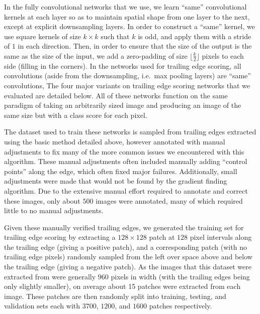 In the fully convolutional networks that we use, we learn ``same'' convolutional kernels at each layer so as to maintain spatial shape from one layer to the next, except at explicit downsampling layers.
In order to construct a ``same'' kernel, we use square kernels of size $k \times k$ such that $k$ is odd, and apply them with a stride of $1$ in each direction.
Then, in order to ensure that the size of the output is the same as the size of the input, we add a zero-padding of size $\lfloor \frac{k}{2} \rfloor$ pixels to each side (filling in the corners).
In the networks used for trailing edge scoring, all convolutions (aside from the downsampling, i.e.\ max pooling layers) are ``same'' convolutions,
The four major variants on trailing edge scoring networks that we evaluated are detailed below.
All of these networks function on the same paradigm of taking an arbitrarily sized image and producing an image of the same size but with a class score for each pixel.

The dataset used to train these networks is sampled from trailing edges extracted using the basic method detailed above, however annotated with manual adjustments to fix many of the more common issues we encountered with this algorithm.
These manual adjustments often included manually adding ``control points'' along the edge, which often fixed major failures.
Additionally, small adjustments were made that would not be found by the gradient finding algorithm.
Due to the extensive manual effort required to annotate and correct these images, only about $500$ images were annotated, many of which required little to no manual adjustments.

Given these manually verified trailing edges, we generated the training set for trailing edge scoring by extracting a $128 \times 128$ patch at $128$ pixel intervals along the trailing edge (giving a positive patch), and a corresponding patch (with no trailing edge pixels) randomly sampled from the left over space above and below the trailing edge (giving a negative patch).
As the images that this dataset were extracted from were generally $960$ pixels in width (with the trailing edges being only slightly smaller), on average about 15 patches were extracted from each image. 
These patches are then randomly split into training, testing, and validation sets each with $3700$, $1200$, and $1600$ patches respectively.


